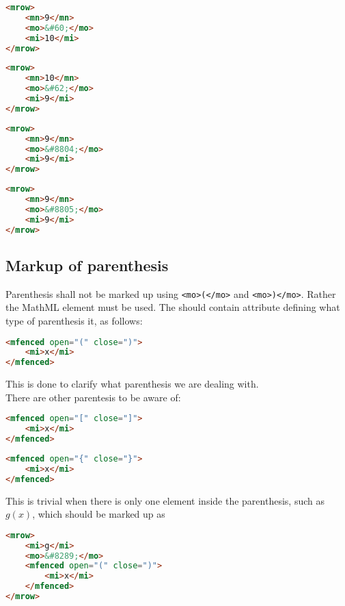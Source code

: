 \documentclass[english,a4paper,11pt]{article}
\begin{document}
\begin{lstlisting}[language=HTML, caption={$9 < 10$}]
<mrow> 
	<mn>9</mn>
	<mo>&#60;</mo>
	<mi>10</mi>
</mrow>
\end{lstlisting}
\bigskip
\begin{lstlisting}[language=HTML, caption={$10 > 9$}]
<mrow> 
	<mn>10</mn>
	<mo>&#62;</mo>
	<mi>9</mi>
</mrow>
\end{lstlisting}
\bigskip
\begin{lstlisting}[language=HTML, caption={$9 \leq 9$}]
<mrow> 
	<mn>9</mn>
	<mo>&#8804;</mo>
	<mi>9</mi>
</mrow>
\end{lstlisting}
\bigskip
\begin{lstlisting}[language=HTML, caption={$9 \geq 9$}]
<mrow> 
	<mn>9</mn>
	<mo>&#8805;</mo>
	<mi>9</mi>
</mrow>
\end{lstlisting}

\subsection{Markup of parenthesis}

Parenthesis shall not be marked up using \verb|<mo>(</mo>| and \verb|<mo>)</mo>|. Rather the MathML element  must be used. 
The  should contain attribute defining what type of parenthesis it, as follows: 
\begin{lstlisting}[language=HTML]
<mfenced open="(" close=")">
	<mi>x</mi>
</mfenced>
\end{lstlisting}
This is done to clarify what parenthesis we are dealing with.\\
\bigskip
There are other parentesis to be aware of:

\begin{lstlisting}[language=HTML, caption={Square bracket}]
<mfenced open="[" close="]">
	<mi>x</mi>
</mfenced>
\end{lstlisting}

\begin{lstlisting}[language=HTML, caption={Curly bracket}]
<mfenced open="{" close="}">
	<mi>x</mi>
</mfenced>
\end{lstlisting}

This is trivial when there is only one element inside the parenthesis, such as $g(x)$, which should be marked up as
\begin{lstlisting}[language=HTML]
<mrow>
	<mi>g</mi>
	<mo>&#8289;</mo>
	<mfenced open="(" close=")">
		<mi>x</mi>
	</mfenced>
</mrow>
\end{lstlisting}
\end{document}
